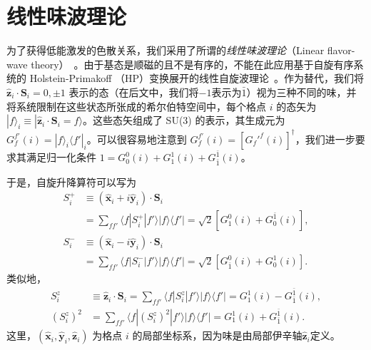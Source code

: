 \section{线性味波理论}
    为了获得低能激发的色散关系，我们采用了所谓的\emph{线性味波理论}（Linear flavor-wave theory）~\cite{joshi1999elementary,li19984}。由于基态是顺磁的且不是有序的，不能在此应用基于自旋有序系统的 Holstein-Primakoff （HP）变换展开的线性自旋波理论~\cite{holstein1940field}。作为替代，我们将 $\hat{\symbf{z}}_i\cdot\symbf{S}_i=0,\pm 1$ 表示的态（在后文中，我们将$-1$表示为$\bar{1}$）视为三种不同的味，并将系统限制在这些状态所张成的希尔伯特空间中，每个格点 $i$ 的态矢为$|f\rangle_i\equiv|\hat{\symbf{z}}_i\cdot\symbf{S}_i=f\rangle$。这些态矢组成了 SU(3) 的表示，其生成元为 $G_f^{f'}(i)=|f\rangle_i\langle f'|_i$。可以很容易地注意到 $G_f^{f'}(i)=\left[G_f'^{f}(i)\right]^\dagger$，我们进一步要求其满足归一化条件 $1=G_0^{0}(i)+G_1^{1}(i)+G_{\bar{1}}^{\bar{1}}(i)$。
    
    于是，自旋升降算符可以写为~\cite{ma2024upper}
    \begin{align}
        S_i^+&\equiv(\hat{\symbf{x}}_i+i\hat{\symbf{y}}_i)\cdot\symbf{S}_i\nonumber\\
        &=\sum_{ff'}\langle f|S_i^+|f' \rangle|f \rangle\langle f'|=\sqrt{2}\left[G_1^0(i)+G_0^{\bar{1}}(i)\right],\\
        S_i^-&\equiv(\hat{\symbf{x}}_i-i\hat{\symbf{y}}_i)\cdot\symbf{S}_i\nonumber\\
        &=\sum_{ff'}\langle f|S_i^-|f' \rangle|f \rangle\langle f'|=\sqrt{2}\left[G_{\bar{1}}^0(i)+G_0^1(i)\right].
    \end{align}
    类似地，
    \begin{align}
         S_i^z&\equiv\hat{\symbf{z}}_i\cdot\symbf{S}_i=\sum_{ff'}\langle f|S_i^z|f' \rangle|f \rangle\langle f'|=G_1^1(i)-G_{\bar{1}}^{\bar{1}}(i),\\
        (S_i^z)^2&=\sum_{ff'}\langle f|(S_i^z)^2|f' \rangle|f \rangle\langle f'|=G_1^1(i)+G_{\bar{1}}^{\bar{1}}(i).
    \end{align}
    这里，$(\hat{\symbf{x}}_i,\hat{\symbf{y}}_i,\hat{\symbf{z}}_i)$ 为格点 $i$ 的局部坐标系，因为味是由局部伊辛轴$\hat{\symbf{z}}_i$定义。
    
